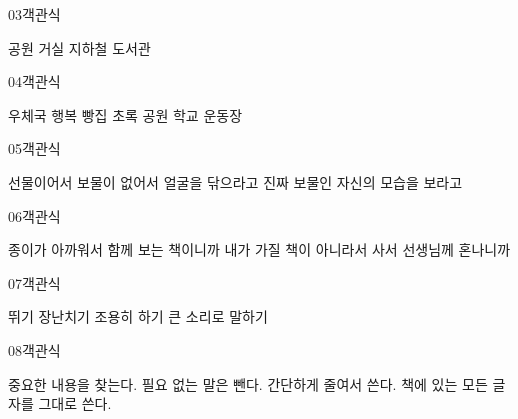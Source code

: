 \documentclass[fs13,seriesSau]{korfarm-base}
\begin{document}
\begin{kfQBlock}{03}{객관식}
\begin{kfChoices}
\kfChoice 공원
\kfChoice 거실
\kfChoice 지하철
\kfChoice 도서관
\end{kfChoices}
\end{kfQBlock}

\begin{kfQBlock}{04}{객관식}
\begin{kfChoices}
\kfChoice 우체국
\kfChoice 행복 빵집
\kfChoice 초록 공원
\kfChoice 학교 운동장
\end{kfChoices}
\end{kfQBlock}

\begin{kfQBlock}{05}{객관식}
\begin{kfChoices}
\kfChoice 선물이어서
\kfChoice 보물이 없어서
\kfChoice 얼굴을 닦으라고
\kfChoice 진짜 보물인 자신의 모습을 보라고
\end{kfChoices}
\end{kfQBlock}

\begin{kfQBlock}{06}{객관식}
\begin{kfChoices}
\kfChoice 종이가 아까워서
\kfChoice 함께 보는 책이니까
\kfChoice 내가 가질 책이 아니라서
\kfChoice 사서 선생님께 혼나니까
\end{kfChoices}
\end{kfQBlock}

\begin{kfQBlock}{07}{객관식}
\begin{kfChoices}
\kfChoice 뛰기
\kfChoice 장난치기
\kfChoice 조용히 하기
\kfChoice 큰 소리로 말하기
\end{kfChoices}
\end{kfQBlock}

\begin{kfQBlock}{08}{객관식}
\begin{kfChoices}
\kfChoice 중요한 내용을 찾는다.
\kfChoice 필요 없는 말은 뺀다.
\kfChoice 간단하게 줄여서 쓴다.
\kfChoice 책에 있는 모든 글자를 그대로 쓴다.
\end{kfChoices}
\end{kfQBlock}
\end{document}
